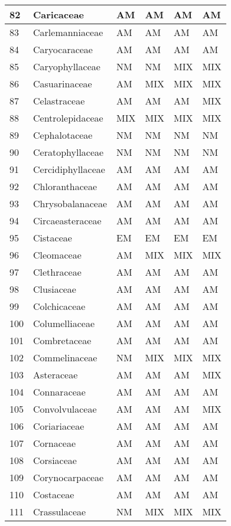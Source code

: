 \documentclass[]{article}
\begin{document}
\begin{longtable}{l|l|l|l|l|l}
\hline
82 & Caricaceae & AM & AM & AM & AM\\
\hline
83 & Carlemanniaceae & AM & AM & AM & AM\\
\hline
84 & Caryocaraceae & AM & AM & AM & AM\\
\hline
85 & Caryophyllaceae & NM & NM & MIX & MIX\\
\hline
86 & Casuarinaceae & AM & MIX & MIX & MIX\\
\hline
87 & Celastraceae & AM & AM & AM & MIX\\
\hline
88 & Centrolepidaceae & MIX & MIX & MIX & MIX\\
\hline
89 & Cephalotaceae & NM & NM & NM & NM\\
\hline
90 & Ceratophyllaceae & NM & NM & NM & NM\\
\hline
91 & Cercidiphyllaceae & AM & AM & AM & AM\\
\hline
92 & Chloranthaceae & AM & AM & AM & AM\\
\hline
93 & Chrysobalanaceae & AM & AM & AM & AM\\
\hline
94 & Circaeasteraceae & AM & AM & AM & AM\\
\hline
95 & Cistaceae & EM & EM & EM & EM\\
\hline
96 & Cleomaceae & AM & MIX & MIX & MIX\\
\hline
97 & Clethraceae & AM & AM & AM & AM\\
\hline
98 & Clusiaceae & AM & AM & AM & AM\\
\hline
99 & Colchicaceae & AM & AM & AM & AM\\
\hline
100 & Columelliaceae & AM & AM & AM & AM\\
\hline
101 & Combretaceae & AM & AM & AM & AM\\
\hline
102 & Commelinaceae & NM & MIX & MIX & MIX\\
\hline
103 & Asteraceae & AM & AM & AM & MIX\\
\hline
104 & Connaraceae & AM & AM & AM & AM\\
\hline
105 & Convolvulaceae & AM & AM & AM & MIX\\
\hline
106 & Coriariaceae & AM & AM & AM & AM\\
\hline
107 & Cornaceae & AM & AM & AM & AM\\
\hline
108 & Corsiaceae & AM & AM & AM & AM\\
\hline
109 & Corynocarpaceae & AM & AM & AM & AM\\
\hline
110 & Costaceae & AM & AM & AM & AM\\
\hline
111 & Crassulaceae & NM & MIX & MIX & MIX\\

\end{longtable}
\end{document}
